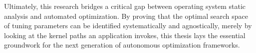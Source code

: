 Ultimately, this research bridges a critical gap between operating system static analysis and automated optimization.
By proving that the optimal search space of tuning parameters can be identified systematically and agnostically, merely by looking at the kernel paths an application invokes, this thesis lays the essential groundwork for the next generation of autonomous optimization frameworks.

\newpage
